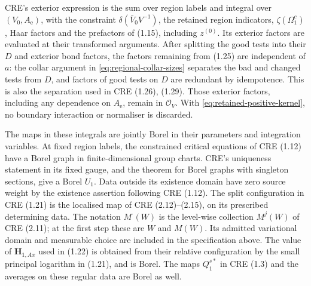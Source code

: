 \documentclass[11pt]{article}
\begin{document}
CRE's exterior expression is the sum over region labels and integral over $(V_0,A_{\mathrm e})$, with the constraint $\delta(\bar V_0V^{-1})$, the retained region indicators, $\zeta(\Omega_1^c)$, Haar factors and the prefactors of (1.15), including $z^{(0)}$. Its exterior factors are evaluated at their transformed arguments. After splitting the good tests into their $D$ and exterior bond factors, the factors remaining from (1.25) are independent of $a$: the collar argument in \eqref{eq:regional-collar-sizes} separates the bad and changed tests from $D$, and factors of good tests on $D$ are redundant by idempotence. This is also the separation used in CRE (1.26), (1.29). Those exterior factors, including any dependence on $A_{\mathrm e}$, remain in $\mathcal O_V$. With \eqref{eq:retained-positive-kernel}, no boundary interaction or normaliser is discarded.

The maps in these integrals are jointly Borel in their parameters and integration variables. At fixed region labels, the constrained critical equations of CRE (1.12) have a Borel graph in finite-dimensional group charts. CRE's uniqueness statement in its fixed gauge, and the theorem for Borel graphs with singleton sections, give a Borel $U_1$. Data outside its existence domain have zero source weight by the existence assertion following CRE (1.12). The split configuration in CRE (1.21) is the localised map of CRE (2.12)--(2.15), on its prescribed determining data. The notation $M^{\cdot}(W)$ is the level-wise collection $M^j(W)$ of CRE (2.11); at the first step these are $W$ and $M(W)$. Its admitted variational domain and measurable choice are included in the specification above. The value of $\mathbf H_{1,Ax}$ used in (1.22) is obtained from their relative configuration by the small principal logarithm in (1.21), and is Borel. The maps $Q_1^{s*}$ in CRE (1.3) and the averages on these regular data are Borel as well.
\end{document}

